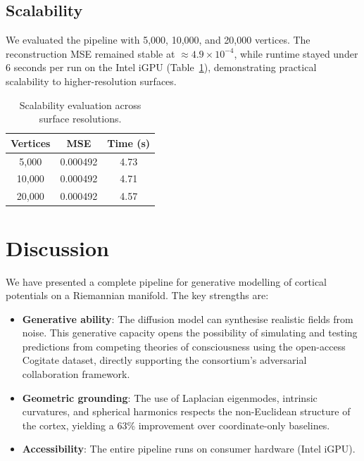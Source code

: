 \documentclass[twocolumn]{article}
\begin{document}
	\subsection{Scalability}
	We evaluated the pipeline with 5,000, 10,000, and 20,000 vertices. The reconstruction MSE remained stable at \(\approx 4.9 \times 10^{-4}\), while runtime stayed under 6 seconds per run on the Intel iGPU (Table~\ref{tab:scalability}), demonstrating practical scalability to higher-resolution surfaces.
	
	\begin{table}[htbp]
		\centering
		\caption{Scalability evaluation across surface resolutions.}
		\label{tab:scalability}
		\begin{tabular}{c c c}
			\toprule
			\textbf{Vertices} & \textbf{MSE} & \textbf{Time (s)} \\
			\midrule
			5,000 & 0.000492 & 4.73 \\
			10,000 & 0.000492 & 4.71 \\
			20,000 & 0.000492 & 4.57 \\
			\bottomrule
		\end{tabular}
	\end{table}
	
	\section{Discussion}
	We have presented a complete pipeline for generative modelling of cortical potentials on a Riemannian manifold. The key strengths are:
	\begin{itemize}
		\item \textbf{Generative ability}: The diffusion model can synthesise realistic fields from noise. This generative capacity opens the possibility of simulating and testing predictions from competing theories of consciousness using the open-access Cogitate dataset, directly supporting the consortium's adversarial collaboration framework.
		\item \textbf{Geometric grounding}: The use of Laplacian eigenmodes, intrinsic curvatures, and spherical harmonics respects the non-Euclidean structure of the cortex, yielding a 63\% improvement over coordinate-only baselines.
		\item \textbf{Accessibility}: The entire pipeline runs on consumer hardware (Intel iGPU).
	\end{itemize}
	
\end{document}
